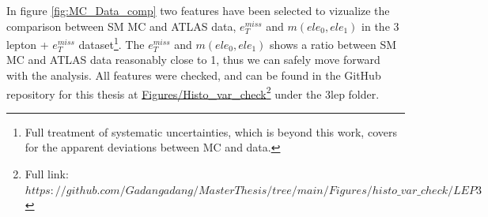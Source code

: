 In figure \ref{fig:MC_Data_comp} two features have been selected to vizualize the comparison between SM MC and ATLAS data, $e_T^{miss}$ 
and $m(ele_0, ele_1)$ in the 3 lepton + $e_T^{miss}$ dataset\footnote{Full treatment of systematic uncertainties, which is beyond this work, covers for the apparent deviations between MC and data.}. The $e_T^{miss}$ and $m(ele_0, ele_1)$ shows a ratio between SM MC and ATLAS data reasonably close to 1, thus we can safely 
move forward with the analysis. All features were checked, and can be found in the GitHub repository for this thesis at 
\href{https://github.com/Gadangadang/MasterThesis/tree/main}{Figures/Histo\_var\_check}\footnote{Full link: \href{https://github.com/Gadangadang/MasterThesis/tree/main/Figures/histo_var_check/LEP3}{$https://github.com/Gadangadang/MasterThesis/tree/main/Figures/histo\_var\_check/LEP3$}} under the 3lep folder. \par 

